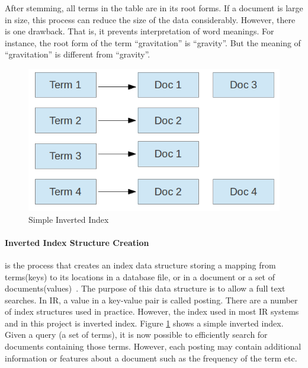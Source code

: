 \begin{table}
\centering
{}
\caption{Terms and Frequency After Stemming} \label{table:stemming}
\end{table}
After stemming, all terms in the table are in its root forms. If a document is large in size, this process can reduce the size of the data considerably. However, 
there is one drawback. That is, it prevents interpretation of word meanings. For instance, the root form of the term ``gravitation'' is ``gravity''. But
the meaning of ``gravitation'' is different from ``gravity''.

\begin{figure}
\centering
\includegraphics[scale=0.5]{./figures/invertedIndex.png}
\caption{Simple Inverted Index} \label{fig:invertedIndex} 
\end{figure}

\paragraph{Inverted Index Structure Creation} is the process that creates an index data structure storing a mapping from terms(keys) to its 
locations in a database file, or in a document or a set of documents(values)~\cite{invertedindex}. 
The purpose of this data structure is to allow a full text searches. In IR, a value in a key-value pair is called posting. There are a number of index
structures used in practice. However, the index used in most IR systems and in this project is inverted index.
Figure \ref{fig:invertedIndex} shows a simple inverted index. Given a query (a set of terms), it is now possible to efficiently search for
documents containing those terms. However, each posting may contain additional information or features
about a document such as the frequency of the term etc.

